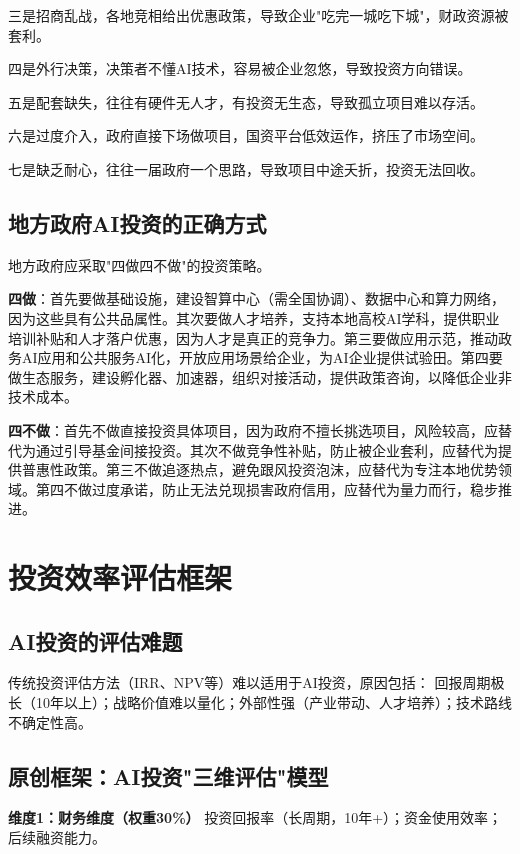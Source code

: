三是招商乱战，各地竞相给出优惠政策，导致企业"吃完一城吃下城"，财政资源被套利。

四是外行决策，决策者不懂AI技术，容易被企业忽悠，导致投资方向错误。

五是配套缺失，往往有硬件无人才，有投资无生态，导致孤立项目难以存活。

六是过度介入，政府直接下场做项目，国资平台低效运作，挤压了市场空间。

七是缺乏耐心，往往一届政府一个思路，导致项目中途夭折，投资无法回收。

\subsection{地方政府AI投资的正确方式}

地方政府应采取"四做四不做"的投资策略。

\textbf{四做}：首先要做基础设施，建设智算中心（需全国协调）、数据中心和算力网络，因为这些具有公共品属性。其次要做人才培养，支持本地高校AI学科，提供职业培训补贴和人才落户优惠，因为人才是真正的竞争力。第三要做应用示范，推动政务AI应用和公共服务AI化，开放应用场景给企业，为AI企业提供试验田。第四要做生态服务，建设孵化器、加速器，组织对接活动，提供政策咨询，以降低企业非技术成本。

\textbf{四不做}：首先不做直接投资具体项目，因为政府不擅长挑选项目，风险较高，应替代为通过引导基金间接投资。其次不做竞争性补贴，防止被企业套利，应替代为提供普惠性政策。第三不做追逐热点，避免跟风投资泡沫，应替代为专注本地优势领域。第四不做过度承诺，防止无法兑现损害政府信用，应替代为量力而行，稳步推进。

\section{投资效率评估框架}

\subsection{AI投资的评估难题}

传统投资评估方法（IRR、NPV等）难以适用于AI投资，原因包括：
回报周期极长（10年以上）；战略价值难以量化；外部性强（产业带动、人才培养）；技术路线不确定性高。

\subsection{原创框架：AI投资"三维评估"模型}

\textbf{维度1：财务维度（权重30\%）}
投资回报率（长周期，10年+）；资金使用效率；后续融资能力。

